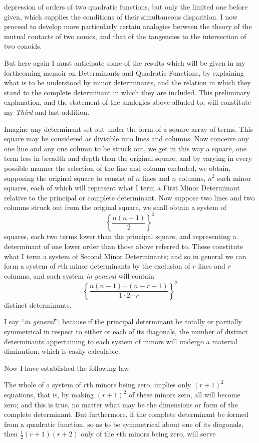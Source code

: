 \documentclass[11pt]{article}
\newcommand{\sourcepage}[1]{\marginpar{\scriptsize p.~#1}}
\begin{document}
\sourcepage{147}
depression of orders of two quadratic functions, but only the limited one before given, which supplies the conditions of their simultaneous disparition. I now proceed to develop more particularly certain analogies between the theory of the mutual contacts of two conics, and that of the tangencies to the intersection of two conoids.

But here again I must anticipate some of the results which will be given in my forthcoming memoir on Determinants and Quadratic Functions, by explaining what is to be understood by minor determinants, and the relation in which they stand to the complete determinant in which they are included. This preliminary explanation, and the statement of the analogies above alluded to, will constitute my \emph{Third} and last addition.

Imagine any determinant set out under the form of a square array of terms. This square may be considered as divisible into lines and columns. Now conceive any one line and any one column to be struck out, we get in this way a square, one term less in breadth and depth than the original square; and by varying in every possible manner the selection of the line and column excluded, we obtain, supposing the original square to consist of $n$ lines and $n$ columns, $n^2$ such minor squares, each of which will represent what I term a First Minor Determinant relative to the principal or complete determinant. Now suppose two lines and two columns struck out from the original square, we shall obtain a system of
\[
\left\{\frac{n(n-1)}{2}\right\}^2
\]
squares, each two terms lower than the principal square, and representing a determinant of one lower order than those above referred to. These constitute what I term a system of Second Minor Determinants; and so in general we can form a system of $r$th minor determinants by the exclusion of $r$ lines and $r$ columns, and such system \emph{in general} will contain
\[
\left\{\frac{n(n-1)\cdots(n-r+1)}{1\cdot2\cdots r}\right\}^2
\]
distinct determinants.

I say ``\emph{in general}''; because if the principal determinant be totally or partially symmetrical in respect to either or each of its diagonals, the number of distinct determinants appertaining to each system of minors will undergo a material diminution, which is easily calculable.

Now I have established the following law:---

The whole of a system of $r$th minors being zero, implies only $(r+1)^2$ equations, that is, by making $(r+1)^2$ of these minors zero, all will become zero; and this is true, no matter what may be the dimensions or form of the complete determinant. But furthermore, if the complete determinant be formed from a quadratic function, so as to be symmetrical about one of its diagonals, then $\frac12(r+1)(r+2)$ only of the $r$th minors being zero, will serve
\end{document}
